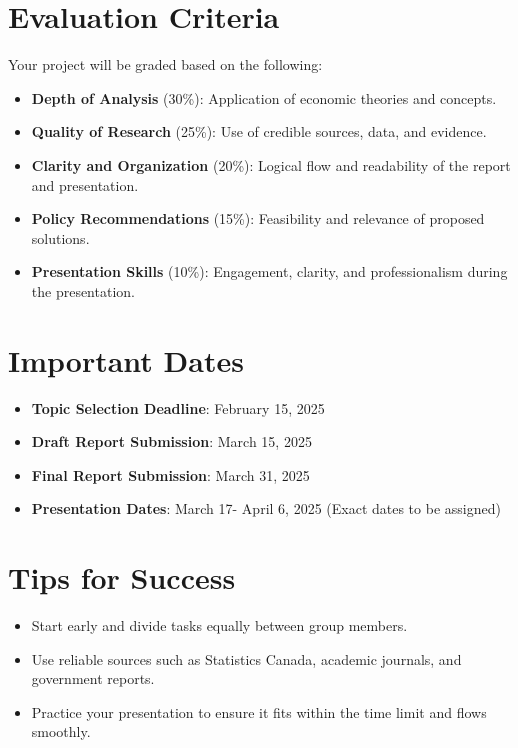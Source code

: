 \documentclass[12pt]{article}
\begin{document}
\section*{Evaluation Criteria}
Your project will be graded based on the following:
\begin{itemize}
    \item \textbf{Depth of Analysis} (30\%): Application of economic theories and concepts.
    \item \textbf{Quality of Research} (25\%): Use of credible sources, data, and evidence.
    \item \textbf{Clarity and Organization} (20\%): Logical flow and readability of the report and presentation.
    \item \textbf{Policy Recommendations} (15\%): Feasibility and relevance of proposed solutions.
    \item \textbf{Presentation Skills} (10\%): Engagement, clarity, and professionalism during the presentation.
\end{itemize}

\section*{Important Dates}
\begin{itemize}
    \item \textbf{Topic Selection Deadline}: February 15, 2025

    \item \textbf{Draft Report Submission}: March 15, 2025 
    \item \textbf{Final Report Submission}: March 31, 2025
    \item \textbf{Presentation Dates}: March 17- April 6, 2025 (Exact dates to be assigned)
\end{itemize}

\section*{Tips for Success}
\begin{itemize}
    \item Start early and divide tasks equally between group members.
    \item Use reliable sources such as Statistics Canada, academic journals, and government reports.
    \item Practice your presentation to ensure it fits within the time limit and flows smoothly.

\end{itemize}
\end{document}
